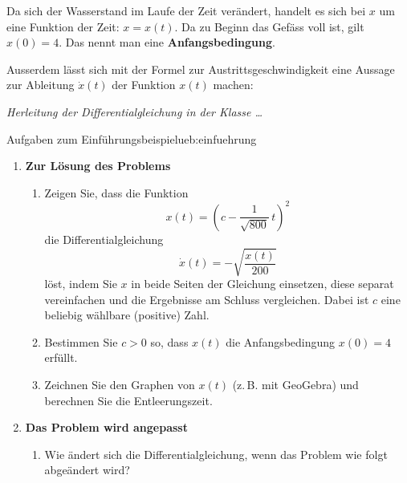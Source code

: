 Da sich der Wasserstand im Laufe der Zeit verändert,
handelt es sich bei \(x\) um eine Funktion der Zeit:
\(x=x(t)\). Da zu Beginn das Gefäss voll ist, gilt
\(x(0)=4\). Das nennt man eine \textbf{Anfangsbedingung}.

Ausserdem lässt sich mit der Formel zur
Austrittsgeschwindigkeit eine Aussage zur Ableitung
\(\dot{x}(t)\) der Funktion \(x(t)\) machen:

\clearpage

\textit{Herleitung der Differentialgleichung in der Klasse \dots}


\clearpage


\begin{ueb}{Aufgaben zum Einführungsbeispiel}{ueb:einfuehrung}

    \begin{enumerate}
        \item \textbf{Zur Lösung des Problems}

              \begin{enumerate}
                  \item Zeigen Sie, dass die Funktion
                        \[
                            x(t)=\left(c-\frac{1}{\sqrt{800}}\,t\right)^2
                        \]
                        die Differentialgleichung
                        \[
                            \dot{x}(t)=-\sqrt{\frac{x(t)}{200}}
                        \]
                        löst, indem Sie \(x\) in beide Seiten der Gleichung
                        einsetzen, diese separat vereinfachen und die Ergebnisse
                        am Schluss vergleichen. Dabei ist \(c\) eine beliebig
                        wählbare (positive) Zahl.

                  \item Bestimmen Sie \(c>0\) so, dass \(x(t)\) die
                        Anfangsbedingung \(x(0)=4\) erfüllt.

                  \item Zeichnen Sie den Graphen von \(x(t)\)
                        (z.\,B. mit GeoGebra) und berechnen Sie die
                        Entleerungszeit.
              \end{enumerate}

        \item \textbf{Das Problem wird angepasst}

              \begin{enumerate}
                  \item Wie ändert sich die Differentialgleichung,
                        wenn das Problem wie folgt abgeändert wird?


\end{enumerate}
\end{enumerate}
\end{ueb}

